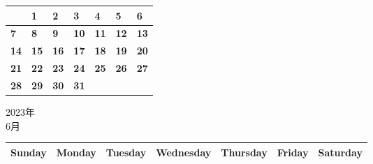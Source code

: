 \documentclass[a4paper,landscape]{jsarticle}
\newcommand{\dig}{\hspace{29mm}}
\newcommand{\tdig}{\hspace{27mm}}
\newcommand{\LBF}{\LARGE\textbf}
\begin{document}
\begingroup
\renewcommand{\arraystretch}{4}
\begin{tabular}{|p{32mm}|p{32mm}|p{32mm}|p{32mm}|p{32mm}|p{32mm}|p{32mm}|}
\hline
&\raisebox{30pt} {\dig\LBF{1}}&\raisebox{30pt} {\dig\LBF{2}}&\raisebox{30pt} {\dig\LBF{3}}&\raisebox{30pt} {\dig\LBF{4}}&\raisebox{30pt} {\dig\LBF{5}}&\raisebox{30pt} {\dig\LBF{6}}\\
\hline
\raisebox{30pt} {\dig\LBF{7}}&\raisebox{30pt} {\dig\LBF{8}}&\raisebox{30pt} {\dig\LBF{9}}&\raisebox{30pt} {\tdig\LBF{10}}&\raisebox{30pt} {\tdig\LBF{11}}&\raisebox{30pt} {\tdig\LBF{12}}&\raisebox{30pt} {\tdig\LBF{13}}\\
\hline
\raisebox{30pt} {\tdig\LBF{14}}&\raisebox{30pt} {\tdig\LBF{15}}&\raisebox{30pt} {\tdig\LBF{16}}&\raisebox{30pt} {\tdig\LBF{17}}&\raisebox{30pt} {\tdig\LBF{18}}&\raisebox{30pt} {\tdig\LBF{19}}&\raisebox{30pt} {\tdig\LBF{20}}\\
\hline
\raisebox{30pt} {\tdig\LBF{21}}&\raisebox{30pt} {\tdig\LBF{22}}&\raisebox{30pt} {\tdig\LBF{23}}&\raisebox{30pt} {\tdig\LBF{24}}&\raisebox{30pt} {\tdig\LBF{25}}&\raisebox{30pt} {\tdig\LBF{26}}&\raisebox{30pt} {\tdig\LBF{27}}\\
\hline
\raisebox{30pt} {\tdig\LBF{28}}&\raisebox{30pt} {\tdig\LBF{29}}&\raisebox{30pt} {\tdig\LBF{30}}&\raisebox{30pt} {\tdig\LBF{31}}&&&\\
\hline
\end{tabular}
\endgroup
\newpage\begin{center}
	\LARGE 2023年\\
	\LARGE 6月
\end{center}

\begingroup
\renewcommand{\arraystretch}{1.4}
\begin{tabular}{|>{\centering\arraybackslash}p{32mm}|>{\centering\arraybackslash}p{32mm}|>{\centering\arraybackslash}p{32mm}|>{\centering\arraybackslash}p{32mm}|>{\centering\arraybackslash}p{32mm}|>{\centering\arraybackslash}p{32mm}|>{\centering\arraybackslash}p{32mm}|}
\hline
\large Sunday&\large Monday &\large Tuesday&\large Wednesday&\large Thursday&\large Friday&\large Saturday\\
\hline
\end{tabular}
\endgroup
\end{document}
